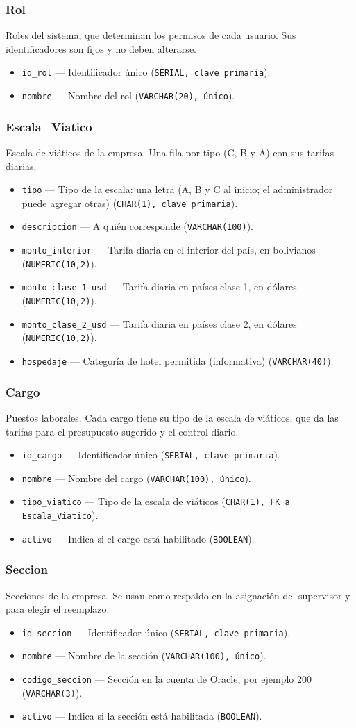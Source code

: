 \documentclass[11pt,letterpaper]{article}
\newcommand{\code}[1]{\nolinkurl{#1}}
\newcommand{\campo}[3]{\item \code{#1} --- #2 (\texttt{#3}).}
\begin{document}
\subsubsection{Rol}
Roles del sistema, que determinan los permisos de cada usuario. Sus identificadores son fijos y no deben alterarse.
\begin{itemize}
  \campo{id_rol}{Identificador único}{SERIAL, clave primaria}
  \campo{nombre}{Nombre del rol}{VARCHAR(20), único}
\end{itemize}

\subsubsection{Escala\_Viatico}
Escala de viáticos de la empresa. Una fila por tipo (C, B y A) con sus tarifas diarias.
\begin{itemize}
  \campo{tipo}{Tipo de la escala: una letra (A, B y C al inicio; el administrador puede agregar otras)}{CHAR(1), clave primaria}
  \campo{descripcion}{A quién corresponde}{VARCHAR(100)}
  \campo{monto_interior}{Tarifa diaria en el interior del país, en bolivianos}{NUMERIC(10,2)}
  \campo{monto_clase_1_usd}{Tarifa diaria en países clase 1, en dólares}{NUMERIC(10,2)}
  \campo{monto_clase_2_usd}{Tarifa diaria en países clase 2, en dólares}{NUMERIC(10,2)}
  \campo{hospedaje}{Categoría de hotel permitida (informativa)}{VARCHAR(40)}
\end{itemize}

\subsubsection{Cargo}
Puestos laborales. Cada cargo tiene su tipo de la escala de viáticos, que da las tarifas para el presupuesto sugerido y el control diario.
\begin{itemize}
  \campo{id_cargo}{Identificador único}{SERIAL, clave primaria}
  \campo{nombre}{Nombre del cargo}{VARCHAR(100), único}
  \campo{tipo_viatico}{Tipo de la escala de viáticos}{CHAR(1), FK a Escala\_Viatico}
  \campo{activo}{Indica si el cargo está habilitado}{BOOLEAN}
\end{itemize}

\subsubsection{Seccion}
Secciones de la empresa. Se usan como respaldo en la asignación del supervisor y para elegir el reemplazo.
\begin{itemize}
  \campo{id_seccion}{Identificador único}{SERIAL, clave primaria}
  \campo{nombre}{Nombre de la sección}{VARCHAR(100), único}
  \campo{codigo_seccion}{Sección en la cuenta de Oracle, por ejemplo 200}{VARCHAR(3)}
  \campo{activo}{Indica si la sección está habilitada}{BOOLEAN}
\end{itemize}
\end{document}
